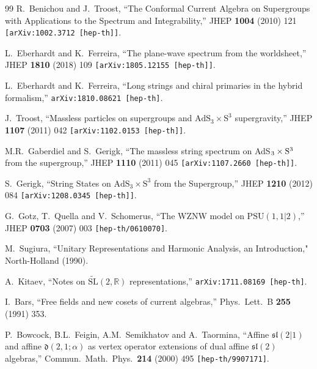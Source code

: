 \documentclass[12pt,a4paper]{article}
\begin{document}
\begin{thebibliography}{99}
  R.~Benichou and J.~Troost,
  ``The Conformal Current Algebra on Supergroups with Applications to the Spectrum and Integrability,''
  JHEP {\bf 1004} (2010) 121
  {\tt [arXiv:1002.3712 [hep-th]]}.
  
L.~Eberhardt and K.~Ferreira,
``The plane-wave spectrum from the worldsheet,''
JHEP {\bf 1810} (2018) 109
{\tt [arXiv:1805.12155 [hep-th]]}.

L.~Eberhardt and K.~Ferreira,
``Long strings and chiral primaries in the hybrid formalism,''
 {\tt arXiv:1810.08621 [hep-th]}.
    
J.~Troost,
``Massless particles on supergroups and $\mathrm{AdS}_3 \times \mathrm{S}^3$ supergravity,''
JHEP {\bf 1107} (2011) 042
{\tt [arXiv:1102.0153 [hep-th]]}.    
    
M.R.~Gaberdiel and S.~Gerigk,
``The massless string spectrum on AdS$_3 \times {\rm S}^3$ from the supergroup,''
JHEP {\bf 1110} (2011) 045
{\tt [arXiv:1107.2660 [hep-th]]}.
   
S.~Gerigk,
``String States on $\mathrm{AdS}_3 \times \mathrm{S}^3$ from the Supergroup,''
JHEP {\bf 1210} (2012) 084
{\tt  [arXiv:1208.0345 [hep-th]]}.  

G.~Gotz, T.~Quella and V.~Schomerus,
``The WZNW model on $\mathrm{PSU}(1,1|2)$,''
JHEP {\bf 0703} (2007) 003
{\tt [hep-th/0610070]}.
    
M.~Sugiura, 
``Unitary Representations and Harmonic Analysis, an Introduction,"
North-Holland (1990).

A.~Kitaev,
``Notes on $\widetilde{\mathrm{SL}}(2,\mathds{R})$ representations,''
{\tt arXiv:1711.08169 [hep-th]}.

I.~Bars,
``Free fields and new cosets of current algebras,''
Phys.\ Lett.\ B {\bf 255} (1991) 353.



 P.~Bowcock, B.L.~Feigin, A.M.~Semikhatov and A.~Taormina,
  ``Affine $\mathfrak{sl}(2|1)$ and affine $\mathfrak{d}(2,1;\alpha)$ as vertex operator extensions of dual affine $\mathfrak{sl}(2)$ algebras,''
Commun.\ Math.\ Phys.\  {\bf 214} (2000) 495
{\tt [hep-th/9907171]}.


\end{thebibliography}
\end{document}
